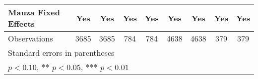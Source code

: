\begin{table}[htbp]
\begin{tabular}{l*{8}{c}}
Mauza Fixed Effects&      Yes   &      Yes   &      Yes   &      Yes   &      Yes   &      Yes   &      Yes   &      Yes   \\
\midrule
Observations    &     3685   &     3685   &      784   &      784   &     4638   &     4638   &      379   &      379   \\
\bottomrule
\multicolumn{9}{l}{\footnotesize Standard errors in parentheses}\\
\multicolumn{9}{l}{\footnotesize * \(p<0.10\), ** \(p<0.05\), *** \(p<0.01\)}\\
\end{tabular}
\end{table}
